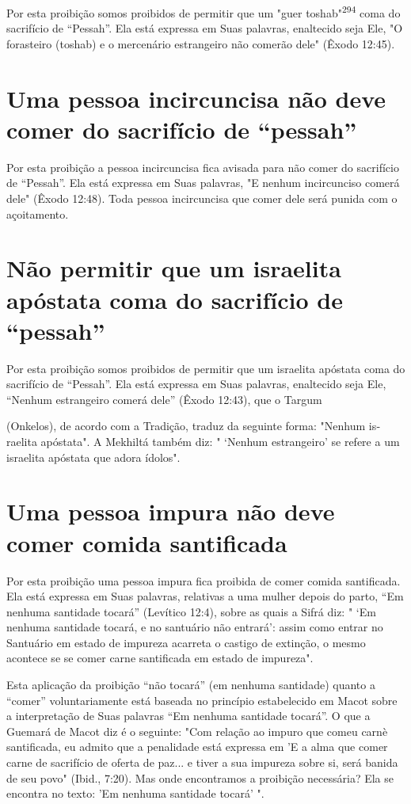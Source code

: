 Por esta proibição somos proibidos de permitir que um "guer
tos­hab"\textsuperscript{294} coma do sacrifício de ``Pessah''. Ela está
expressa em Suas palavras, enaltecido seja Ele, "O forasteiro (toshab) e
o mercenário estrangeiro não co­merão dele" (Êxodo 12:45).

\section{Uma pessoa incircuncisa não deve comer do sacrifício de ``pessah''}

Por esta proibição a pessoa incircuncisa fica avisada para não comer do
sacrifício de ``Pessah''. Ela está expressa em Suas palavras, "E nenhum
incir­cunciso comerá dele" (Êxodo 12:48). Toda pessoa incircuncisa que
comer de­le será punida com o açoitamento.

\section{Não permitir que um israelita apóstata coma do sacrifício de ``pessah''}

Por esta proibição somos proibidos de permitir que um israelita
após­tata coma do sacrifício de ``Pessah''. Ela está expressa em Suas
palavras, enalte­cido seja Ele, ``Nenhum estrangeiro comerá dele'' (Êxodo
12:43), que o Targum

(Onkelos), de acordo com a Tradição, traduz da seguinte forma: "Nenhum
is­raelita apóstata". A Mekhiltá também diz: " `Nenhum estrangeiro' se
refere a um israelita apóstata que adora ídolos".

\section{Uma pessoa impura não deve comer comida santificada}

Por esta proibição uma pessoa impura fica proibida de comer co­mida
santificada. Ela está expressa em Suas palavras, relativas a uma mulher
depois do parto, ``Em nenhuma santidade tocará'' (Levítico 12:4), sobre as
quais a Sifrá diz: " `Em nenhuma santidade tocará, e no santuário não
entrará': assim como entrar no Santuário em estado de impureza acarreta
o castigo de extinção, o mesmo acontece se se comer carne santificada em
estado de impureza".

Esta aplicação da proibição ``não tocará'' (em nenhuma santidade) quanto a
``comer'' voluntariamente está baseada no princípio estabelecido em Macot
sobre a interpretação de Suas palavras ``Em nenhuma santidade tocará''. O
que a Guemará de Macot diz é o seguinte: "Com relação ao impuro que
co­meu carnè santificada, eu admito que a penalidade está expressa em 'E
a alma que comer carne de sacrifício de oferta de paz... e tiver a sua
impureza sobre si, será banida de seu povo" (Ibid., 7:20). Mas onde
encontramos a proibição necessária? Ela se encontra no texto: 'Em
nenhuma santidade tocará' ".


